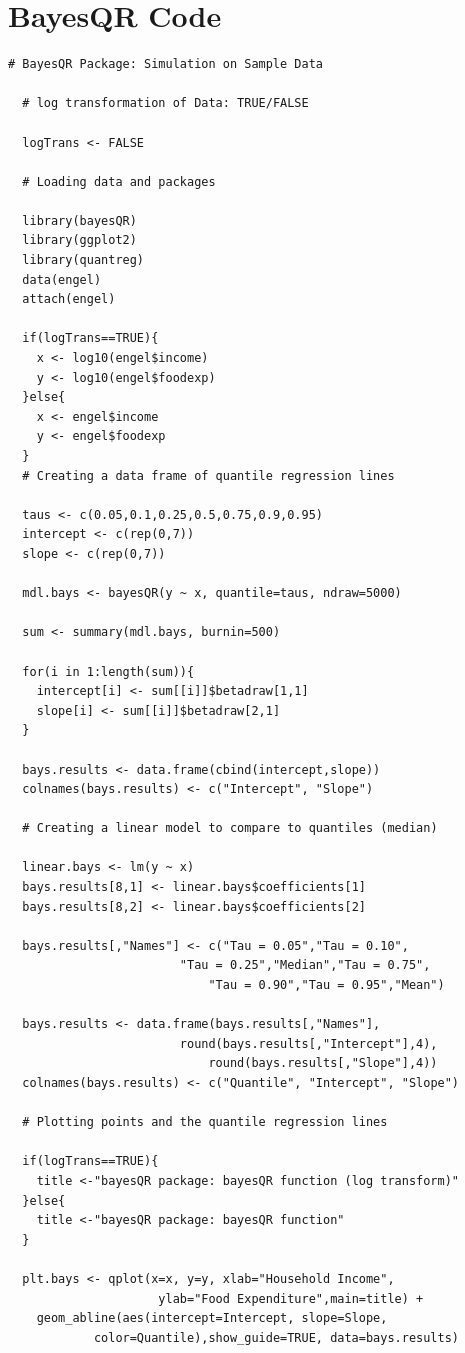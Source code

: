 \documentclass[12pt,a4paper]{report}
\begin{document}
\section{BayesQR Code}\label{App:Engel-Code-bayesQR}
\begin{lstlisting}
# BayesQR Package: Simulation on Sample Data

  # log transformation of Data: TRUE/FALSE

  logTrans <- FALSE

  # Loading data and packages

  library(bayesQR)
  library(ggplot2)
  library(quantreg)
  data(engel)
  attach(engel)

  if(logTrans==TRUE){
    x <- log10(engel$income)
    y <- log10(engel$foodexp)
  }else{
    x <- engel$income
    y <- engel$foodexp
  }
  # Creating a data frame of quantile regression lines

  taus <- c(0.05,0.1,0.25,0.5,0.75,0.9,0.95)
  intercept <- c(rep(0,7))
  slope <- c(rep(0,7))

  mdl.bays <- bayesQR(y ~ x, quantile=taus, ndraw=5000)

  sum <- summary(mdl.bays, burnin=500)

  for(i in 1:length(sum)){
    intercept[i] <- sum[[i]]$betadraw[1,1]
    slope[i] <- sum[[i]]$betadraw[2,1]
  }

  bays.results <- data.frame(cbind(intercept,slope))
  colnames(bays.results) <- c("Intercept", "Slope")

  # Creating a linear model to compare to quantiles (median)

  linear.bays <- lm(y ~ x)
  bays.results[8,1] <- linear.bays$coefficients[1]
  bays.results[8,2] <- linear.bays$coefficients[2]

  bays.results[,"Names"] <- c("Tau = 0.05","Tau = 0.10",
                        "Tau = 0.25","Median","Tau = 0.75",
                            "Tau = 0.90","Tau = 0.95","Mean")

  bays.results <- data.frame(bays.results[,"Names"],
                        round(bays.results[,"Intercept"],4),
                            round(bays.results[,"Slope"],4))
  colnames(bays.results) <- c("Quantile", "Intercept", "Slope")

  # Plotting points and the quantile regression lines

  if(logTrans==TRUE){
    title <-"bayesQR package: bayesQR function (log transform)"
  }else{
    title <-"bayesQR package: bayesQR function"
  }

  plt.bays <- qplot(x=x, y=y, xlab="Household Income",
                     ylab="Food Expenditure",main=title) +
    geom_abline(aes(intercept=Intercept, slope=Slope,
            color=Quantile),show_guide=TRUE, data=bays.results)

\end{lstlisting}
\end{document}

